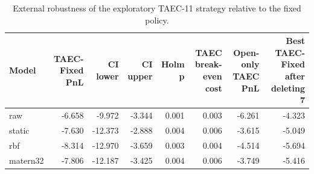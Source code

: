 \begin{table}
\caption{External robustness of the exploratory TAEC-11 strategy relative to the fixed policy.}
\label{tab:taec-robustness}
\begin{tabular}{lrrrrrrr}
\toprule
Model & TAEC-Fixed PnL & CI lower & CI upper & Holm p & TAEC break-even cost & Open-only TAEC PnL & Best TAEC-Fixed after deleting 7 \\
\midrule
raw & -6.658 & -9.972 & -3.344 & 0.001 & 0.003 & -6.261 & -4.323 \\
static & -7.630 & -12.373 & -2.888 & 0.004 & 0.006 & -3.615 & -5.049 \\
rbf & -8.314 & -12.970 & -3.659 & 0.003 & 0.004 & -4.514 & -5.694 \\
matern32 & -7.806 & -12.187 & -3.425 & 0.004 & 0.006 & -3.749 & -5.416 \\
\bottomrule
\end{tabular}
\end{table}
